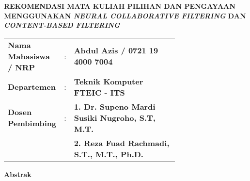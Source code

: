 {
\begin{center}
    \uppercase{\textbf{\large Rekomendasi mata kuliah pilihan dan pengayaan menggunakan \emph{Neural Collaborative Filtering} dan \emph{Content-Based Filtering}}}
\end{center}

\vspace*{6 mm}
\begin{adjustwidth}{-0.2cm}{}
    \begin{tabular}{lcp{0.7\linewidth}}
        \noindent\textbf{Nama Mahasiswa / NRP} & : & \textbf{Abdul Azis / 0721 19 4000 7004}                \\
        \noindent\textbf{Departemen}           & : & \textbf{Teknik Komputer FTEIC - ITS}                   \\
        \noindent\textbf{Dosen Pembimbing}     & : & \textbf{1. Dr. Supeno Mardi Susiki Nugroho, S.T, M.T.} \\
                                               &   & \textbf{2. Reza Fuad Rachmadi, S.T., M.T., Ph.D.}      \\
    \end{tabular}
\end{adjustwidth}

\vspace{6 mm}
\noindent\textbf{Abstrak}
\vspace{3 mm}

}

